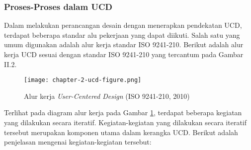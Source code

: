 \subsubsection{Proses-Proses dalam UCD}

Dalam melakukan perancangan desain dengan menerapkan pendekatan UCD, terdapat beberapa standar alu pekerjaan yang dapat diikuti. Salah satu yang umum digunakan adalah alur kerja standar ISO 9241-210. Berikut adalah alur kerja UCD sesuai dengan standar ISO 9241-210 yang tercantum pada Gambar II.2.

\begin{figure}[h]
  \centering
  \texttt{[image: chapter-2-ucd-figure.png]}
  \caption{Alur kerja \textit{User-Centered Design} (ISO 9241-210, 2010)}
  \label{fig:diagram_iso2}
\end{figure}

Terlihat pada diagram alur kerja pada Gambar \ref{fig:diagram_iso2}, terdapat beberapa kegiatan yang dilakukan secara iteratif. Kegiatan-kegiatan yang dilakukan secara iteratif tersebut merupakan komponen utama dalam kerangka UCD. Berikut adalah penjelasan mengenai kegiatan-kegiatan tersebut:

